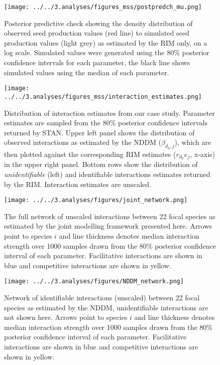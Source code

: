 \documentclass[a4,12pt]{article}
\begin{document}
    \begin{figure}[H]
        \texttt{[image: ../../3.analyses/figures\_mss/postpredch\_mu.png]}
        \caption{Posterior predictive check showing the density distribution of observed seed production values (red line) to simulated seed production values (light grey) as estimated by the RIM only, on a log scale. Simulated values were generated using the 80\% posterior confidence intervals for each parameter, the black line shows simulated values using the median of each parameter. }
        \label{fig:ppcheckmu1}
    \end{figure}

    \begin{figure}[H]
        \texttt{[image: ../../3.analyses/figures\_mss/interaction\_estimates.png]}
        \caption{Distribution of interaction estimates from our case study. Parameter estimates are sampled from the 80\% posterior confidence intervals returned by STAN. Upper left panel shows the distribution of observed interactions as estimated by the NDDM ($\beta_{d_k, j}$), which are then plotted against the corresponding RIM estimates ($r_{d_k} e_j$, x-axis) in the upper right panel. Bottom rows show the distribution of \textit{unidentifiable} (left) and identifiable interactions estimates returned by the RIM. Interaction estimates are unscaled.}
        \label{fig:adist}
    \end{figure}


    \begin{figure}[H]
        \texttt{[image: ../../3.analyses/figures/joint\_network.png]}
        \caption{The full network of unscaled interactions between 22 focal species as estimated by the joint modelling framework presented here. Arrows point to species $i$ and line thickness denotes median interaction strength over 1000 samples drawn from the 80\% posterior confidence interval of each parameter. Facilitative interactions are shown in blue and competitive interactions are shown in yellow.}
        \label{fig:jointnetwork}
    \end{figure}

    \begin{figure}[H]
        \texttt{[image: ../../3.analyses/figures/NDDM\_network.png]}
        \caption{Network of identifiable interactions (unscaled) between 22 focal species as estimated by the NDDM, unidentifiable interactions are not shown here. Arrows point to species $i$ and line thickness denotes median interaction strength over 1000 samples drawn from the 80\% posterior confidence interval of each parameter. Facilitative interactions are shown in blue and competitive interactions are shown in yellow.}
        \label{fig:jointnetwork}
    \end{figure}
\end{document}
